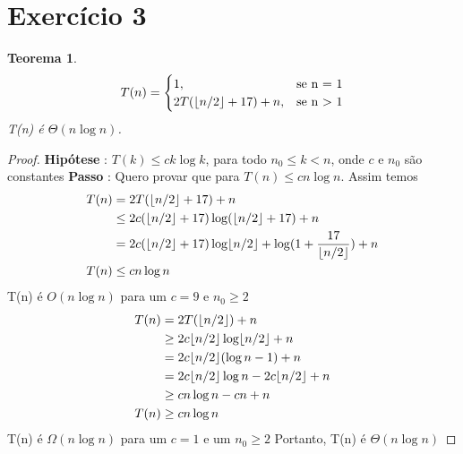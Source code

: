 \documentclass{article}
\DeclarePairedDelimiter\floor{\lfloor}{\rfloor}
\begin{document}
\section{Exercício 3}
\newtheorem{teo3}{Teorema}
\begin{teo3}
    \begin{equation}
        T(n)=\begin{cases}
        1, & \text{se n = 1}\\
        2T(\floor*{n/2} + 17) + n, & \text{se n > 1}
    \end{cases}
    \end{equation}
    T(n) é $\Theta(n \log n)$.
\end{teo3}
\begin{proof}
    \hfill \break
    \textbf{Hipótese} : $T(k) \leq ck\log k$, para todo $n_0 \leq k < n$, onde $c$ e $n_0$ são constantes\newline
    \textbf{Passo} : Quero provar que para $T(n) \leq cn\log n$.\newline
    \hspace*{30pt} Assim temos \newline
    \begin{equation}
        \begin{split}
            T(n) &= 2T(\floor*{n/2} + 17) + n \\
            & \leq 2c(\floor*{n/2}+17)\log (\floor*{n/2} + 17) + n\\
            & = 2c(\floor*{n/2}+17)\log \floor*{n/2} + \log(1+\dfrac{17}{\floor*{n/2}}) + n\\
            T(n) & \leq cn \log n
        \end{split}
    \end{equation}
    T(n) é $O(n\log n)$ para um $c = 9$ e $n_0 \geq 2$
    \begin{equation}
        \begin{split}
            T(n) &= 2T(\floor*{n/2}) + n \\
            & \geq 2c\floor*{n/2} \log \floor*{n/2} + n\\
            & = 2c\floor*{n/2} (\log n - 1) + n\\
            & = 2c\floor*{n/2}\log n - 2c\floor*{n/2} + n \\
            & \geq cn\log n - cn + n\\
            T(n) & \geq cn \log n
        \end{split}
    \end{equation}
    T(n) é $\Omega(n\log n)$ para um $c = 1$ e um $n_0 \geq 2$\newline
    Portanto, T(n) é $\Theta(n\log n)$
\end{proof}
\end{document}
